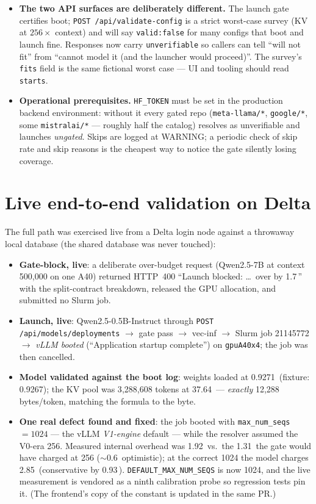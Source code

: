 \documentclass[11pt]{article}
\newcommand{\code}[1]{\texttt{#1}}
\newcommand{\gib}{\,\text{GiB}}
\begin{document}
\begin{itemize}[leftmargin=1.4em]
  value follow-up.
\item \textbf{The two API surfaces are deliberately different.} The launch
  gate certifies boot; \code{POST /api/validate-config} is a strict
  worst-case survey (KV at $256\times$ context) and will say
  \code{valid:false} for many configs that boot and launch fine. Responses
  now carry \code{unverifiable} so callers can tell ``will not fit'' from
  ``cannot model it (and the launcher would proceed)''. The survey's
  \code{fits} field is the same fictional worst case --- UI and tooling should
  read \code{starts}.
\item \textbf{Operational prerequisites.} \code{HF\_TOKEN} must be set in the
  production backend environment: without it every gated repo
  (\code{meta-llama/*}, \code{google/*}, some \code{mistralai/*} ---
  roughly half the catalog) resolves as unverifiable and launches
  \emph{ungated}. Skips are logged at WARNING; a periodic check of skip rate
  and skip reasons is the cheapest way to notice the gate silently losing
  coverage.
\end{itemize}

\section{Live end-to-end validation on Delta}
\label{sec:live}

The full path was exercised live from a Delta login node against a throwaway
local database (the shared database was never touched):

\begin{itemize}[leftmargin=1.4em]
\item \textbf{Gate-block, live}: a deliberate over-budget request
  (Qwen2.5-7B at context 500{,}000 on one A40) returned HTTP~400
  ``Launch blocked: \dots\ over by 1.7\gib'' with the split-contract
  breakdown, released the GPU allocation, and submitted no Slurm job.
\item \textbf{Launch, live}: Qwen2.5-0.5B-Instruct through
  \code{POST /api/models/deployments} $\to$ gate pass $\to$ vec-inf $\to$
  Slurm job 21145772 $\to$ \emph{vLLM booted} (``Application startup
  complete'') on \code{gpuA40x4}; the job was then cancelled.
\item \textbf{Model validated against the boot log}: weights loaded at
  0.9271\gib{} (fixture: 0.9267); the KV pool was 3{,}288{,}608 tokens at
  37.64\gib{} --- \emph{exactly} 12{,}288 bytes/token, matching the formula
  to the byte.
\item \textbf{One real defect found and fixed}: the job booted with
  \code{max\_num\_seqs}${}=1024$ --- the vLLM \emph{V1-engine} default ---
  while the resolver assumed the V0-era 256. Measured internal overhead was
  1.92\gib{} vs.\ the 1.31\gib{} the gate would have charged at 256
  ($\sim$0.6\gib{} optimistic); at the correct 1024 the model charges
  2.85\gib{} (conservative by 0.93\gib). \code{DEFAULT\_MAX\_NUM\_SEQS}
  is now 1024, and the live measurement is vendored as a ninth calibration
  probe so regression tests pin it. (The frontend's copy of the constant is
  updated in the same PR.)
\end{itemize}
\end{document}
